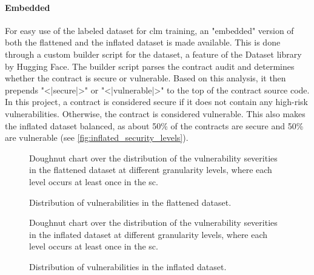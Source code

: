 \paragraph{Embedded}
\label{sec:verified-smart-contracts-audit-embedded}
For easy use of the labeled dataset for \acrfull{clm} training, an
"embedded" version of both the flattened and the inflated dataset is made
available. This is done through a custom builder script for the dataset, a feature
of the Dataset library by Hugging Face. The builder script parses the contract audit and determines whether the contract is secure or vulnerable. Based on this analysis, it then prepends "<|secure|>" or "<|vulnerable|>" to the top of the contract source code. In this project, a contract is considered secure if it does not contain any high-risk vulnerabilities. Otherwise, the contract is considered vulnerable. This also makes the inflated dataset balanced, as about 50\% of the contracts are secure and 50\% are vulnerable (see \cref{fig:inflated_security_levels}).

\begin{figure}[htbp]
    \centering
    
    \caption{Doughnut chart over the distribution of the vulnerability severities in the flattened dataset at different granularity levels, where each level occurs at least once in the \acrshort{sc}.}
    \label{fig:flattened_security_levels}
    \vspace*{\floatsep}%
    
    \caption{Distribution of vulnerabilities in the flattened dataset.}
    \label{fig:flattened_vulnerabilities_bar}
\end{figure}

\begin{figure}[htbp]
    \centering
    
    \caption{Doughnut chart over the distribution of the vulnerability severities in the inflated dataset at different granularity levels, where each level occurs at least once in the \acrshort{sc}.}
    \label{fig:inflated_security_levels}
    
    \vspace*{\floatsep}%

    
    \caption{Distribution of vulnerabilities in the inflated dataset.}
    \label{fig:inflated_vulnerabilities_bar}
\end{figure}

